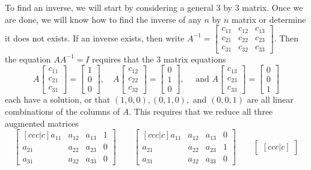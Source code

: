 {To find an inverse, we will start by considering a general 3 by 3 matrix. Once we are done, we will know how to find the inverse of any $n$ by $n$ matrix or determine it does not exists.  
If an inverse exists, then write $A^{-1} = \begin{bmatrix}
c_{11}&c_{12}&c_{13}\\ 
c_{21}&c_{22}&c_{23}\\ 
c_{31}&c_{32}&c_{33} 
\end{bmatrix} $. Then the equation $AA^{-1}=I$ requires that the 3 matrix equations
$$A\begin{bmatrix} c_{11}\\ c_{21}\\c_{31}\end{bmatrix} = \begin{bmatrix} 1\\0\\0\end{bmatrix},\quad
A\begin{bmatrix} c_{12}\\ c_{22}\\c_{32}\end{bmatrix} = \begin{bmatrix} 0\\1\\0\end{bmatrix},\quad \text{ and }
A\begin{bmatrix} c_{13}\\ c_{23}\\c_{33}\end{bmatrix} = \begin{bmatrix} 0\\ 0\\1\end{bmatrix}$$
each have a solution, or that $(1,0,0), (0,1,0),$ and  $(0,0,1)$ are all linear combinations of the columns of $A$. This requires that we reduce all three augmented matrices
$$
\begin{bmatrix}[ccc|c]
a_{11}&a_{12}&a_{13}&1\\ 
a_{21}&a_{22}&a_{23}&0\\ 
a_{31}&a_{32}&a_{33}&0 
\end{bmatrix}
\quad\quad
\begin{bmatrix}[ccc|c]
a_{11}&a_{12}&a_{13}&0\\ 
a_{21}&a_{22}&a_{23}&1\\ 
a_{31}&a_{32}&a_{33}&0 
\end{bmatrix}
\quad\quad
\begin{bmatrix}[ccc|c]

\end{bmatrix}$$}
